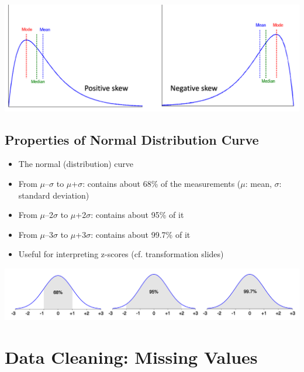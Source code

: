 \documentclass[11pt]{article}
\theoremstyle{definition}
\begin{document}
\includegraphics[width=\textwidth]{13.png}
\subsection{Properties of Normal Distribution Curve}
\begin{itemize}
    \item The normal (distribution) curve
    \item From $\mu$–$\sigma$ to $\mu$+$\sigma$: contains about 68\% of the measurements
    ($\mu$: mean, $\sigma$: standard deviation)
    \item From $\mu$–2$\sigma$ to $\mu$+2$\sigma$: contains about 95\% of it
    \item From $\mu$–3$\sigma$ to $\mu$+3$\sigma$: contains about 99.7\% of it
    \item Useful for interpreting z-scores (cf. transformation slides)
\end{itemize}
\includegraphics[width=\textwidth]{14.png}

\section{Data Cleaning: Missing Values}
\end{document}
